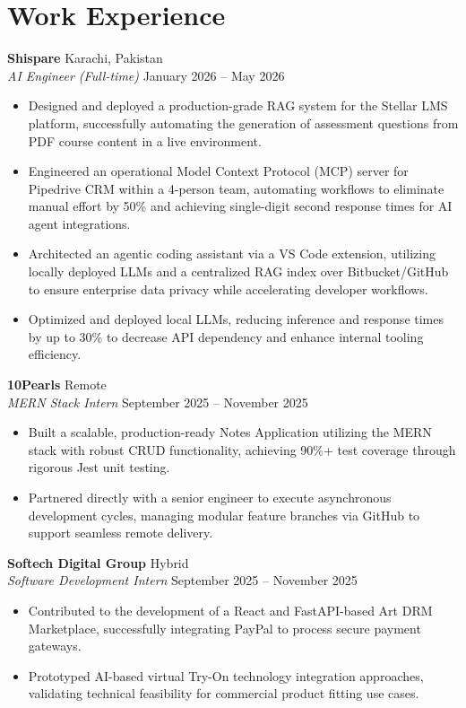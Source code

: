 \documentclass[11pt, a4paper]{article}
\begin{document}
\section*{Work Experience}

\textbf{Shispare} \hfill Karachi, Pakistan \\
\textit{AI Engineer (Full-time)} \hfill January 2026 -- May 2026
\begin{itemize}[leftmargin=0.25in, itemsep=2pt]
    \item Designed and deployed a production-grade RAG system for the Stellar LMS platform, successfully automating the generation of assessment questions from PDF course content in a live environment.
    \item Engineered an operational Model Context Protocol (MCP) server for Pipedrive CRM within a 4-person team, automating workflows to eliminate manual effort by 50\% and achieving single-digit second response times for AI agent integrations.
    \item Architected an agentic coding assistant via a VS Code extension, utilizing locally deployed LLMs and a centralized RAG index over Bitbucket/GitHub to ensure enterprise data privacy while accelerating developer workflows.
    \item Optimized and deployed local LLMs, reducing inference and response times by up to 30\% to decrease API dependency and enhance internal tooling efficiency.
\end{itemize}

\textbf{10Pearls} \hfill Remote \\
\textit{MERN Stack Intern} \hfill September 2025 -- November 2025
\begin{itemize}[leftmargin=0.25in, itemsep=2pt]
    \item Built a scalable, production-ready Notes Application utilizing the MERN stack with robust CRUD functionality, achieving 90\%+ test coverage through rigorous Jest unit testing.
    \item Partnered directly with a senior engineer to execute asynchronous development cycles, managing modular feature branches via GitHub to support seamless remote delivery.
\end{itemize}

\textbf{Softech Digital Group} \hfill Hybrid \\
\textit{Software Development Intern} \hfill September 2025 -- November 2025
\begin{itemize}[leftmargin=0.25in, itemsep=2pt]
    \item Contributed to the development of a React and FastAPI-based Art DRM Marketplace, successfully integrating PayPal to process secure payment gateways.
    \item Prototyped AI-based virtual Try-On technology integration approaches, validating technical feasibility for commercial product fitting use cases.
\end{itemize}
\end{document}
